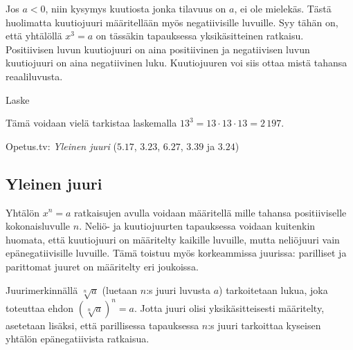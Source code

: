 
Jos $a<0$, niin kysymys kuutiosta jonka tilavuus on $a$, ei ole mielekäs. Tästä huolimatta kuutiojuuri määritellään myös negatiivisille luvuille. Syy tähän on, että yhtälöllä $x^3=a$ on tässäkin tapauksessa yksikäsitteinen ratkaisu. Positiivisen luvun kuutiojuuri on aina positiivinen ja negatiivisen luvun kuutiojuuri on aina negatiivinen luku. Kuutiojuuren voi siis ottaa mistä tahansa reaaliluvusta.

\begin{esimerkki}
Laske
	\begin{esimratk}
Tämä voidaan vielä tarkistaa laskemalla $13^3 = 13\cdot 13\cdot 13=2\,197$.
	\end{esimratk}
	\begin{esimvast}
	\end{esimvast}
\end{esimerkki}

{Opetus.tv: \emph{Yleinen juuri} ($5.17$, $3.23$, $6.27$, $3.39$ ja $3.24$)}

\subsection{Yleinen juuri}

Yhtälön $x^n=a$ ratkaisujen avulla voidaan määritellä  mille tahansa positiiviselle kokonaisluvulle $n$. Neliö- ja kuutiojuurten tapauksessa voidaan kuitenkin huomata, että kuutiojuuri on määritelty kaikille luvuille, mutta neliöjuuri vain epänegatiivisille luvuille. Tämä toistuu myös korkeammissa juurissa: parilliset ja parittomat juuret on määritelty eri joukoissa.

Juurimerkinnällä $\sqrt[n]{a}$ (luetaan $n$:s juuri luvusta $a$) tarkoitetaan lukua, joka toteuttaa ehdon $(\sqrt[n]{a})^n = a$. Jotta juuri olisi yksikäsitteisesti määritelty, asetetaan lisäksi, että parillisessa tapauksessa $n$:s juuri tarkoittaa kyseisen yhtälön epänegatiivista ratkaisua.

